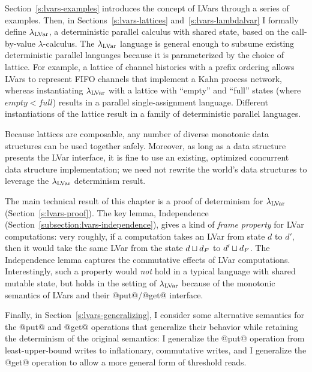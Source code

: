 Section~\ref{s:lvars-examples} introduces the concept of LVars through
a series of examples.  Then, in Sections~\ref{s:lvars-lattices}
and~\ref{s:lvars-lambdalvar} I formally define $\lambda_{\textrm{LVar}}$, a
deterministic parallel calculus with shared state, based on the
call-by-value $\lambda$-calculus.  The $\lambda_{\textrm{LVar}}$ language is
general enough to subsume existing deterministic parallel languages
because it is parameterized by the choice of lattice.  For example, a
lattice of channel histories with a prefix ordering allows LVars to
represent FIFO channels that implement a Kahn process network, whereas
instantiating $\lambda_{\textrm{LVar}}$ with a lattice with ``empty'' and ``full''
states (where $\mathit{empty} <
\mathit{full}$) results in a parallel single-assignment language.
Different instantiations of the lattice result in a family of
deterministic parallel languages.

Because lattices are composable, any number of diverse monotonic data
structures can be used together safely.  Moreover, as long as a data
structure presents the LVar interface, it is fine to use an existing,
optimized concurrent data structure implementation; we need not
rewrite the world's data structures to leverage the $\lambda_{\textrm{LVar}}$
determinism result.

The main technical result of this chapter is a proof of determinism
for $\lambda_{\textrm{LVar}}$ (Section~\ref{s:lvars-proof}).  The key lemma,
Independence (Section~\ref{subsection:lvars-independence}), gives a
kind of \emph{frame property} for LVar computations: very roughly, if
a computation takes an LVar from state $d$ to $d'$, then it would take
the same LVar from the state $d \sqcup d_F$ to
$d' \sqcup d_F$.  The Independence lemma captures the commutative
effects of LVar computations.  Interestingly, such a property
would \emph{not} hold in a typical language with shared mutable state,
but holds in the setting of $\lambda_{\textrm{LVar}}$ because of the monotonic
semantics of LVars and their @put@/@get@ interface.

Finally, in Section~\ref{s:lvars-generalizing}, I consider some
alternative semantics for the @put@ and @get@ operations that
generalize their behavior while retaining the determinism of the
original semantics: I generalize the @put@ operation from
least-upper-bound writes to inflationary, commutative writes, and I
generalize the @get@ operation to allow a more general form of
threshold reads.

